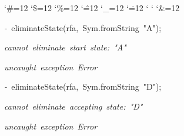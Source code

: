 \begin{list}{}
{\setlength{\leftmargin}{\leftmargini}
\setlength{\rightmargin}{0cm}
\setlength{\itemindent}{0cm}
\setlength{\listparindent}{0cm}
\setlength{\itemsep}{0cm}
\setlength{\parsep}{0cm}
\setlength{\labelsep}{0cm}
\setlength{\labelwidth}{0cm}
\catcode`\#=12
\catcode`\$=12
\catcode`\%=12
\catcode`\^=12
\catcode`\_=12
\catcode`\.=12
\catcode`
\catcode`
\catcode`\&=12
\ttfamily}
\small
\item[]\textsl{-\ }eliminateState(rfa,\ Sym.fromString\ "A");
\item[]\textsl{cannot\ eliminate\ start\ state:\ "A"}
\item[]
\item[]\textsl{uncaught\ exception\ Error}
\item[]\textsl{-\ }eliminateState(rfa,\ Sym.fromString\ "D");
\item[]\textsl{cannot\ eliminate\ accepting\ state:\ "D"}
\item[]
\item[]\textsl{uncaught\ exception\ Error}
\end{list}
